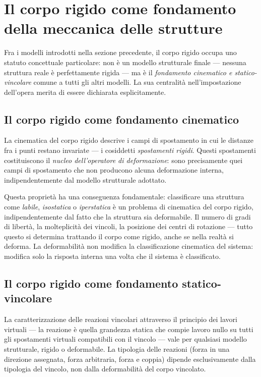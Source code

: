 \section{Il corpo rigido come fondamento della meccanica delle strutture}

Fra i modelli introdotti nella sezione precedente, il corpo rigido occupa uno statuto concettuale particolare: non è un modello strutturale finale --- nessuna struttura reale è perfettamente rigida --- ma è il \textit{fondamento cinematico e statico-vincolare} comune a tutti gli altri modelli. La sua centralità nell'impostazione dell'opera merita di essere dichiarata esplicitamente.

\subsection{Il corpo rigido come fondamento cinematico}

La cinematica del corpo rigido descrive i campi di spostamento in cui le distanze fra i punti restano invariate --- i cosiddetti \textit{spostamenti rigidi}. Questi spostamenti costituiscono il \textit{nucleo dell'operatore di deformazione}: sono precisamente quei campi di spostamento che non producono alcuna deformazione interna, indipendentemente dal modello strutturale adottato.

Questa proprietà ha una conseguenza fondamentale: classificare una struttura come \textit{labile}, \textit{isostatica} o \textit{iperstatica} è un problema di cinematica del corpo rigido, indipendentemente dal fatto che la struttura sia deformabile. Il numero di gradi di libertà, la molteplicità dei vincoli, la posizione dei centri di rotazione --- tutto questo si determina trattando il corpo come rigido, anche se nella realtà si deforma. La deformabilità non modifica la classificazione cinematica del sistema: modifica solo la risposta interna una volta che il sistema è classificato.

\subsection{Il corpo rigido come fondamento statico-vincolare}

La caratterizzazione delle reazioni vincolari attraverso il principio dei lavori virtuali --- la reazione è quella grandezza statica che compie lavoro nullo su tutti gli spostamenti virtuali compatibili con il vincolo --- vale per qualsiasi modello strutturale, rigido o deformabile. La tipologia delle reazioni (forza in una direzione assegnata, forza arbitraria, forza e coppia) dipende esclusivamente dalla tipologia del vincolo, non dalla deformabilità del corpo vincolato.

